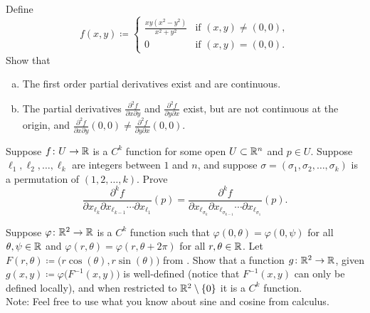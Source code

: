 \begin{exercise} \label{exercise:mixedpartialsunequal}
Define
\begin{equation*}
f(x,y) \coloneqq
\begin{cases}
\frac{xy(x^2-y^2)}{x^2+y^2} & \text{if } (x,y) \not= (0,0),\\
0                           & \text{if } (x,y) = (0,0).
\end{cases}
\end{equation*}
Show that
\begin{enumerate}[a)]
\item
The first order partial derivatives exist and are continuous.
\item
The partial derivatives
$\frac{\partial^2 f}{\partial x \partial y}$ and
$\frac{\partial^2 f}{\partial y \partial x}$ exist, but are not continuous
at the origin, and 
$\frac{\partial^2 f}{\partial x \partial y}(0,0) \not= 
\frac{\partial^2 f}{\partial y \partial x}(0,0)$.
\end{enumerate}
\end{exercise}

\begin{exercise}
Suppose $f \colon U \to {\mathbb{R}}$ is a $C^k$ function for some open $U \subset
{\mathbb{R}}^n$ and $p \in U$.  Suppose ${\ell}_1,{\ell}_2,\ldots,{\ell}_k$ are integers between $1$
and $n$, and suppose $\sigma=(\sigma_1,\sigma_2,\ldots,\sigma_k)$ is a
permutation of $(1,2,\ldots,k)$.  Prove
\begin{equation*}
\frac{\partial^{k} f}{\partial x_{{\ell}_{k}} \partial x_{{\ell}_{k-1}}
\cdots \partial x_{{\ell}_1}} (p)
=
\frac{\partial^{k} f}{\partial x_{{\ell}_{\sigma_k}} \partial
x_{{\ell}_{\sigma_{k-1}}}
\cdots \partial x_{{\ell}_{\sigma_1}}} (p) .
\end{equation*}
\end{exercise}

\begin{exercise}
Suppose $\varphi \colon {\mathbb{R}}^2 \to {\mathbb{R}}$ is a $C^k$ function
such that
$\varphi(0,\theta) = \varphi(0,\psi)$ for all $\theta,\psi \in {\mathbb{R}}$
and
$\varphi(r,\theta) = \varphi(r,\theta+2\pi)$ for all $r,\theta \in {\mathbb{R}}$.
Let $F(r,\theta) \coloneqq \bigl(r \cos(\theta), r \sin(\theta) \bigr)$ from 
.  Show that a function
$g \colon {\mathbb{R}}^2 \to {\mathbb{R}}$, given
$g(x,y) \coloneqq \varphi \bigl(F^{-1}(x,y)\bigr)$ is well-defined (notice that
$F^{-1}(x,y)$ can only be defined locally), and
when restricted to ${\mathbb{R}}^2 \setminus \{ 0 \}$ it is a $C^k$ function.
\\
Note: Feel free to use what you know about sine and cosine from calculus.
\end{exercise}

